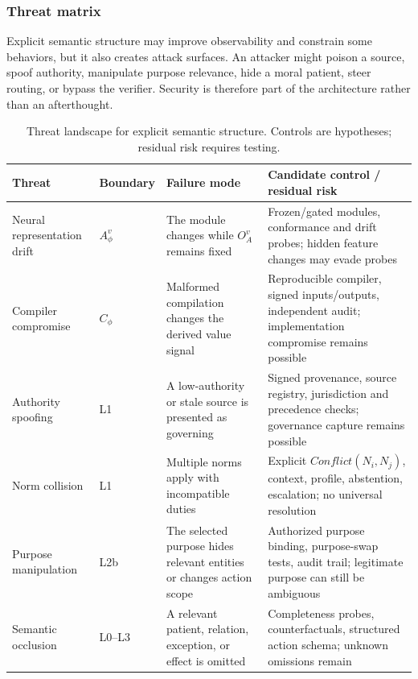 \subsubsection{Threat matrix}
\label{sec:threats}

Explicit semantic structure may improve observability and constrain some behaviors, but it also creates attack surfaces. An attacker might poison a source, spoof authority, manipulate purpose relevance, hide a moral patient, steer routing, or bypass the verifier. Security is therefore part of the architecture rather than an afterthought.

\begin{table}[t]
\centering
\scriptsize
\caption{Threat landscape for explicit semantic structure. Controls are hypotheses; residual risk requires testing.}
\label{tab:threats}
\renewcommand{\arraystretch}{1.12}
\begin{tabularx}{\textwidth}{@{}>{\raggedright\arraybackslash}p{}>{\raggedright\arraybackslash}p{}>{\raggedright\arraybackslash}X>{\raggedright\arraybackslash}X@{}}
\toprule
Threat & Boundary & Failure mode & Candidate control / residual risk \\
\midrule
Neural representation drift & $A_\phi^v$ & The module changes while $O_A^v$ remains fixed & Frozen/gated modules, conformance and drift probes; hidden feature changes may evade probes \\
Compiler compromise & $C_\phi$ & Malformed compilation changes the derived value signal & Reproducible compiler, signed inputs/outputs, independent audit; implementation compromise remains possible \\
Authority spoofing & L1 & A low-authority or stale source is presented as governing & Signed provenance, source registry, jurisdiction and precedence checks; governance capture remains possible \\
Norm collision & L1 & Multiple norms apply with incompatible duties & Explicit $\mathit{Conflict}(N_i,N_j)$, context, profile, abstention, escalation; no universal resolution \\
Purpose manipulation & L2b & The selected purpose hides relevant entities or changes action scope & Authorized purpose binding, purpose-swap tests, audit trail; legitimate purpose can still be ambiguous \\
Semantic occlusion & L0--L3 & A relevant patient, relation, exception, or effect is omitted & Completeness probes, counterfactuals, structured action schema; unknown omissions remain \\

\end{tabularx}
\end{table}
